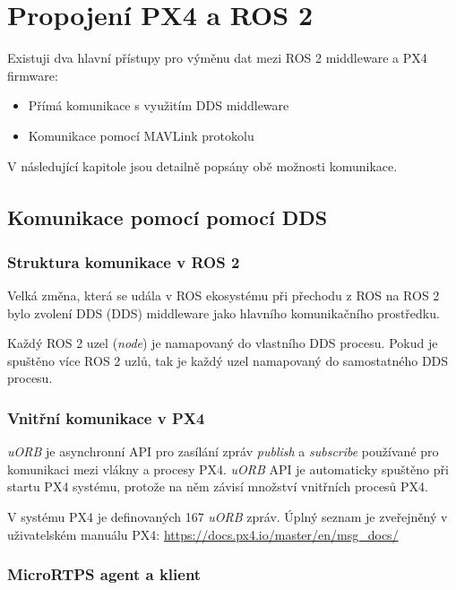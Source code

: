 \chapter{Propojení PX4 a ROS 2}

Existuji dva hlavní přístupy pro výměnu dat mezi ROS 2 middleware a PX4 firmware:

\begin{itemize}
    \item Přímá komunikace s využitím \acs{DDS} middleware
    \item Komunikace pomocí MAVLink protokolu\\
\end{itemize}

V následující kapitole jsou detailně popsány obě možnosti komunikace.

\section{Komunikace pomocí pomocí DDS\texorpdfstring{\textsuperscript{\textregistered}}{ (R)}}

\subsection{Struktura komunikace v ROS 2}

Velká změna, která se udála v ROS ekosystému při přechodu z ROS na ROS 2 bylo zvolení \acs{DDS} (\acl{DDS}) middleware jako hlavního komunikačního prostředku.

Každý ROS 2 uzel (\textit{node}) je namapovaný do vlastního \acs{DDS} procesu. Pokud je spuštěno více ROS 2 uzlů, tak je každý uzel namapovaný do samostatného \acs{DDS} procesu. \cite{ROS2DDS3}

\subsection{Vnitřní komunikace v PX4}

\textit{uORB} je asynchronní \acs{API} pro zasílání zpráv \textit{publish} a \textit{subscribe} používané pro komunikaci mezi vlákny a procesy PX4. \textit{uORB} \acs{API} je automaticky spuštěno při startu PX4 systému, protože na něm závisí množství vnitřních procesů PX4.

V systému PX4 je definovaných 167 \textit{uORB} zpráv. Úplný seznam je zveřejněný v uživatelském manuálu PX4: \url{https://docs.px4.io/master/en/msg_docs/} \cite{PX4docs}

\subsection{MicroRTPS agent a klient}
\label{sec:komunikace}

